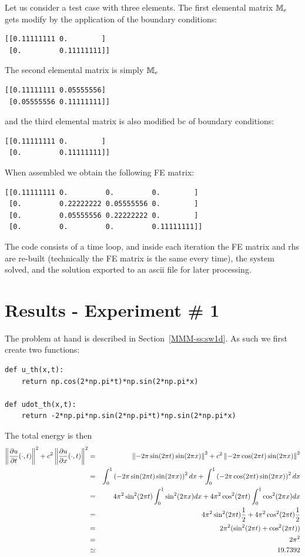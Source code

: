 Let us consider a test case with three elements. 
The first elemental matrix ${\mathbb{M}}_e$
gets modify by the application of the boundary conditions:
\begin{verbatim}
[[0.11111111 0.        ]
 [0.         0.11111111]]
\end{verbatim}
The second elemental matrix is simply ${\mathbb{M}}_e$
\begin{verbatim}
[[0.11111111 0.05555556]
 [0.05555556 0.11111111]]
\end{verbatim}
and the third elemental matrix is also modified bc of boundary conditions:
\begin{verbatim}
[[0.11111111 0.        ]
 [0.         0.11111111]]
\end{verbatim}
When assembled we obtain the following FE matrix:
\begin{verbatim}
[[0.11111111 0.         0.         0.        ]
 [0.         0.22222222 0.05555556 0.        ]
 [0.         0.05555556 0.22222222 0.        ]
 [0.         0.         0.         0.11111111]]
\end{verbatim}

The code consists of a time loop, and inside each iteration 
the FE matrix and rhs are re-built (technically the FE matrix 
is the same every time), the system solved, and the solution
exported to an ascii file for later processing.

\section*{Results - Experiment \# 1}

The problem at hand is described in Section~\ref{MMM-ss:sw1d}.
As such we first create two functions:

\begin{lstlisting}
def u_th(x,t):
    return np.cos(2*np.pi*t)*np.sin(2*np.pi*x)

def udot_th(x,t):
    return -2*np.pi*np.sin(2*np.pi*t)*np.sin(2*np.pi*x)
\end{lstlisting}

The total energy is then
\begin{eqnarray}
\left\|  \frac{\partial u}{\partial t} (\cdot, t)  \right\|^2 + 
c^2 \left\|  \frac{\partial u}{\partial x} (\cdot, t)  \right\|^2
&=&
\left\|  -2\pi \sin(2 \pi t) \sin (2 \pi x)  \right\|^2 + 
c^2 \left\|  -2\pi \cos (2\pi t) \sin(2 \pi x)  \right\|^2 \nonumber\\
&=&
\int_0^1 \left(  -2\pi \sin(2 \pi t) \sin(2 \pi x) \right)^2 dx
+\int_0^1 \left(  -2\pi \cos (2\pi t) \sin(2 \pi x) \right)^2 dx \nonumber\\
&=&
4\pi^2 \sin^2(2 \pi t) \int_0^1  \sin^2(2 \pi x)  dx
+4\pi^2 \cos^2(2 \pi t)\int_0^1  \cos^2(2 \pi x)  dx \nonumber\\
&=&  4\pi^2 \sin^2(2 \pi t) \frac12 +  4\pi^2 \cos^2(2 \pi t) \frac12  \nonumber\\
&=&  2\pi^2 (\sin^2(2 \pi t) + \cos^2(2 \pi t) )   \nonumber\\
&=& 2 \pi^2 \nonumber\\
&\simeq& 19.7392
\end{eqnarray}


